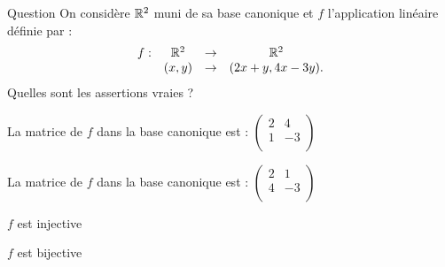 \begin{multi}[multiple,feedback=
{Soit \({\cal {B}}=\{e_1,e_2\}\) la base canonique de \(\Rr^2\). La matrice de \(f\) dans la base  \({\cal {B}}\) est la matrice  dont la \(j\)ième colonne est constituée des coordonnées de  \(f(e_j)\) dans la base \({\cal {B}}\). Cette matrice est : 
\(
\left(\begin{array}{rc}
2&1\\
4&-3\\ 
\end{array}\right)\).
\vskip0mm
On vérifie que \(\ker f=\{(0,0)\}\), donc \(f\) est un endomorphisme  injectif de \(\Rr^2\), 
et donc \(f\) est bijectif.
}]{Question}
On considère \(\Rr^2\) muni de sa base canonique et \(f\) l'application linéaire définie par :
\[\begin{array}{rccc}f:&\mathbb{R}^2 &\to& \mathbb{R}^2\\
& (x,y)&\to &(2x+y,4x-3y).\end{array}\]
Quelles sont les assertions vraies ?

    \item La matrice de \(f\) dans la base canonique est : \(
\left(\begin{array}{rc}
2&4\\
1&-3\\
\end{array}\right)\)
    \item* La matrice de \(f\) dans la base canonique est : \(
\left(\begin{array}{rc}
2&1\\
4&-3\\
\end{array}\right)\)
    \item* \(f\) est injective
    \item* \(f\) est bijective
\end{multi}


